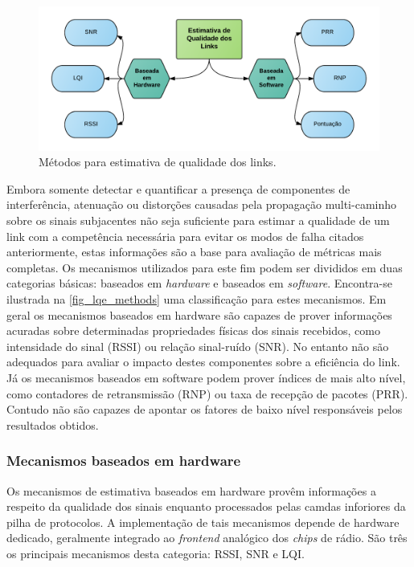 \documentclass[
	12pt,				%
	openright,			%
	oneside,
	a4paper,			%
	english,			%
	french,				%
	spanish,			%
	brazil				%
	]{abntex2}
\begin{document}
\begin{figure}[htb]
	\caption{\label{fig_lqe_methods}Métodos para estimativa de qualidade dos links.}
	\begin{center}
		\includegraphics[width=\linewidth]{WSN_LQE_Methods}
	\end{center}
\end{figure}

Embora somente detectar e quantificar a presença de componentes de interferência, atenuação ou distorções causadas pela propagação multi-caminho sobre os sinais subjacentes não seja suficiente para estimar a qualidade de um link com a competência necessária para evitar os modos de falha citados anteriormente, estas informações são a base para avaliação de métricas mais completas. Os mecanismos utilizados para este fim podem ser divididos em duas categorias básicas: baseados em \textit{hardware} e baseados em \textit{software}. Encontra-se ilustrada na \autoref{fig_lqe_methods} uma classificação para estes mecanismos. Em geral os mecanismos baseados em hardware são capazes de prover informações acuradas sobre determinadas propriedades físicas dos sinais recebidos, como intensidade do sinal (RSSI) ou relação sinal-ruído (SNR). No entanto não são adequados para avaliar o impacto destes componentes sobre a eficiência do link. Já os mecanismos baseados em software podem prover índices de mais alto nível, como contadores de retransmissão (RNP) ou taxa de recepção de pacotes (PRR). Contudo não são capazes de apontar os fatores de baixo nível responsáveis pelos resultados obtidos.

\subsubsection{Mecanismos baseados em hardware}

Os mecanismos de estimativa baseados em hardware provêm informações a respeito da qualidade dos sinais enquanto processados pelas camdas inforiores da pilha de protocolos. A implementação de tais mecanismos depende de hardware dedicado, geralmente integrado ao \textit{frontend} analógico dos \textit{chips} de rádio. São três os principais mecanismos desta categoria: RSSI, SNR e LQI.
\end{document}
